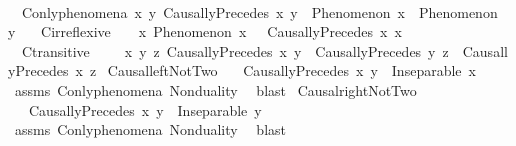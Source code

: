 \begin{isabellebody}
\isanewline
{}\isamarkupfalse%
\ \isanewline
\ \ C{}{\isacharunderscore}{\kern0pt}only{\isacharunderscore}{\kern0pt}phenomena{\isacharcolon}{\kern0pt}\ {\isachardoublequoteopen}{\isasymforall}x\ y{\isachardot}{\kern0pt}\ CausallyPrecedes\ x\ y\ {\isasymlongrightarrow}\ Phenomenon\ x\ {\isasymand}\ Phenomenon\ y{\isachardoublequoteclose}\ \isanewline
\ \ C{}{\isacharunderscore}{\kern0pt}irreflexive{\isacharcolon}{\kern0pt}\ \ \ \ {\isachardoublequoteopen}{\isasymforall}x{\isachardot}{\kern0pt}\ Phenomenon\ x\ {\isasymlongrightarrow}\ {\isasymnot}\ CausallyPrecedes\ x\ x{\isachardoublequoteclose}\ \isanewline
\ \ C{}{\isacharunderscore}{\kern0pt}transitive{\isacharcolon}{\kern0pt}\ \ \ \ \ {\isachardoublequoteopen}{\isasymforall}x\ y\ z{\isachardot}{\kern0pt}\ CausallyPrecedes\ x\ y\ {\isasymand}\ CausallyPrecedes\ y\ z\ {\isasymlongrightarrow}\ CausallyPrecedes\ x\ z{\isachardoublequoteclose}\isanewline
\isanewline
{}\isamarkupfalse%
\ Causal{\isacharunderscore}{\kern0pt}left{\isacharunderscore}{\kern0pt}NotTwo{\isacharcolon}{\kern0pt}\isanewline
\ \ \ {\isachardoublequoteopen}CausallyPrecedes\ x\ y{\isachardoublequoteclose}\ \ {\isachardoublequoteopen}Inseparable\ x\ {\isasymOmega}{\isachardoublequoteclose}\isanewline
%
\isadelimproof
\ \ %
\endisadelimproof
%
\isatagproof
{}\isamarkupfalse%
\ assms\ C{}{\isacharunderscore}{\kern0pt}only{\isacharunderscore}{\kern0pt}phenomena\ Nonduality\ \isamarkupfalse%
\ blast%
\endisatagproof
{\isafoldproof}%
%
\isadelimproof
\isanewline
%
\endisadelimproof
\isanewline
{}\isamarkupfalse%
\ Causal{\isacharunderscore}{\kern0pt}right{\isacharunderscore}{\kern0pt}NotTwo{\isacharcolon}{\kern0pt}\isanewline
\ \ \ {\isachardoublequoteopen}CausallyPrecedes\ x\ y{\isachardoublequoteclose}\ \ {\isachardoublequoteopen}Inseparable\ y\ {\isasymOmega}{\isachardoublequoteclose}\isanewline
%
\isadelimproof
\ \ %
\endisadelimproof
%
\isatagproof
{}\isamarkupfalse%
\ assms\ C{}{\isacharunderscore}{\kern0pt}only{\isacharunderscore}{\kern0pt}phenomena\ Nonduality\ \isamarkupfalse%
\ blast%
\endisatagproof
{\isafoldproof}%
%
\isadelimproof
%
\endisadelimproof
%
\isadelimdocument
%
\endisadelimdocument
%
\isatagdocument
%
\end{isabellebody}
